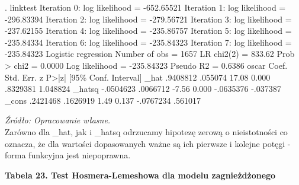 \begin{stlog}
. linktest 
{\smallskip}
Iteration 0:   log likelihood = -652.65521  
Iteration 1:   log likelihood = -296.83394  
Iteration 2:   log likelihood = -279.56721  
Iteration 3:   log likelihood = -237.62155  
Iteration 4:   log likelihood = -235.86757  
Iteration 5:   log likelihood = -235.84334  
Iteration 6:   log likelihood = -235.84323  
Iteration 7:   log likelihood = -235.84323  
{\smallskip}
Logistic regression                               Number of obs   =       1657
                                                  LR chi2(2)      =     833.62
                                                  Prob > chi2     =     0.0000
Log likelihood = -235.84323                       Pseudo R2       =     0.6386
{\smallskip}
       oscar {\VBAR}      Coef.   Std. Err.      z    P>|z|     [95\% Conf. Interval]
        _hat {\VBAR}   .9408812    .055074    17.08   0.000     .8329381    1.048824
      _hatsq {\VBAR}  -.0504623   .0066712    -7.56   0.000    -.0635376    -.037387
       _cons {\VBAR}   .2421468   .1626919     1.49   0.137    -.0767234     .561017

\end{stlog}

\textit{\footnotesize{Źródło: Opracowanie własne.}} \\

Zarówno dla _hat, jak i _hatsq odrzucamy hipotezę zerową o nieistotności co oznacza, że dla wartości dopasowanych ważne są ich pierwsze i kolejne potęgi - forma funkcyjna jest niepoprawna.

\vspace{0.5cm}

\textbf{Tabela 23. Test Hosmera-Lemeshowa dla modelu zagnieżdżonego}

